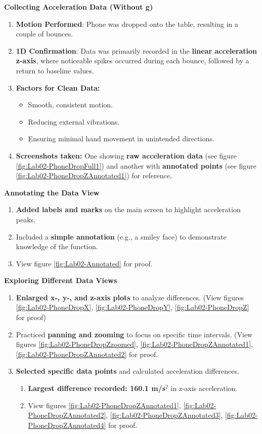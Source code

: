 \documentclass[idxtotoc,hyperref,openany]{labbook} %
\begin{document}
\textbf{Collecting Acceleration Data (Without g)}
\begin{enumerate}[$\bullet$]
    \item \textbf{Motion Performed}: Phone was dropped onto the table, resulting in a couple of bounces.
    \item \textbf{1D Confirmation}: Data was primarily recorded in the \textbf{linear acceleration z-axis}, where noticeable spikes occurred during each bounce, followed by a return to baseline values.
    \item \textbf{Factors for Clean Data:}
    \begin{itemize}[$\bullet$]
        \item Smooth, consistent motion.
        \item Reducing external vibrations.
        \item Ensuring minimal hand movement in unintended directions.
    \end{itemize}
    \item \textbf{Screenshots taken:} One showing \textbf{raw acceleration data} (see figure \ref{fig:Lab02-PhoneDropFull1}) and another with \textbf{annotated points} (see figure \ref{fig:Lab02-PhoneDropZAnnotated1}) for reference.
\end{enumerate}
\textbf{Annotating the Data View}
\begin{enumerate}[$\bullet$]
    \item \textbf{Added labels and marks} on the main screen to highlight acceleration peaks.
    \item Included a \textbf{simple annotation} (e.g., a smiley face) to demonstrate knowledge of the function.
    \item View figure \ref{fig:Lab02-Annotated} for proof.
\end{enumerate}
\newpage
\textbf{Exploring Different Data Views}
\begin{enumerate}[$\bullet$]
    \item \textbf{Enlarged x-, y-, and z-axis plots} to analyze differences. (View figures \ref{fig:Lab02-PhoneDropX}, \ref{fig:Lab02-PhoneDropY}, \ref{fig:Lab02-PhoneDropZ} for proof)
    \item Practiced \textbf{panning and zooming} to focus on specific time intervals. (View figures \ref{fig:Lab02-PhoneDropZzoomed}, \ref{fig:Lab02-PhoneDropZAnnotated1}, \ref{fig:Lab02-PhoneDropZAnnotated2} for proof.
    \item \textbf{Selected specific data points} and calculated acceleration differences.
    \begin{enumerate}[$\bullet$]
        \item \textbf{Largest difference recorded: 160.1 m/s$^2$} in z-axis acceleration.
        \item View figures \ref{fig:Lab02-PhoneDropZAnnotated1}, \ref{fig:Lab02-PhoneDropZAnnotated2}, \ref{fig:Lab02-PhoneDropZAnnotated3}, \ref{fig:Lab02-PhoneDropZAnnotated4} for proof.
    \end{enumerate}
\end{enumerate}
\end{document}
